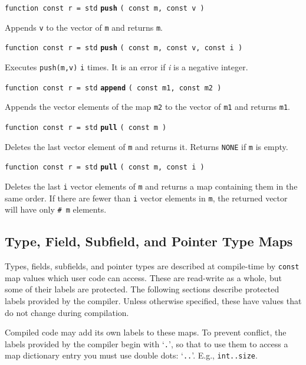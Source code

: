 \documentclass[12pt]{article}
\newcommand{\ttkey}[1]{{\tt \bfseries #1}}
\newenvironment{indpar}[1][0.3in]%
	{\begin{list}{}%
		     {\setlength{\itemsep}{0in}%
		      \setlength{\topsep}{0in}%
		      \setlength{\parsep}{1ex}%
		      \setlength{\labelwidth}{#1}%
		      \setlength{\leftmargin}{#1}%
		      \addtolength{\leftmargin}{\labelsep}}%
	 \item}%
	{\end{list}}
\begin{document}
{\tt function const r = std} \ttkey{push} {\tt ( const m, const v )}
\begin{indpar}
Appends {\tt v} to the vector of {\tt m} and returns {\tt m}.
\end{indpar}

{\tt function const r = std} \ttkey{push} {\tt ( const m, const v, const i )}
\begin{indpar}
Executes {\tt push(m,v)} {\tt i} times.  It is an error if {\em i}
is a negative integer.
\end{indpar}

{\tt function const r = std} \ttkey{append} {\tt ( const m1, const m2 )}
\begin{indpar}
Appends the vector elements of the map {\tt m2} to the vector of {\tt m1}
and returns {\tt m1}.
\end{indpar}

{\tt function const r = std} \ttkey{pull} {\tt ( const m )}
\begin{indpar}
Deletes the last vector element of {\tt m} and returns it.
Returns {\tt NONE} if {\tt m} is empty.
\end{indpar}

{\tt function const r = std} \ttkey{pull} {\tt ( const m, const i )}
\begin{indpar}
Deletes the last {\tt i} vector elements of {\tt m} and returns a map
containing them in the same order.
If there are fewer than {\tt i} vector elements
in {\tt m}, the returned vector will have only {\tt \# m} elements.
\end{indpar}

\subsection{Type, Field, Subfield, and Pointer Type Maps}
\label{TYPE-FIELD-SUBFIELD-MAPS}

Types, fields, subfields, and pointer types are described
at compile-time by {\tt const} map values which
user code can access.
These are read-write as a whole, but some of their
labels are protected.  The following sections describe protected labels
provided by the compiler.  Unless otherwise specified,
these have values that do not change during compilation.

Compiled code may add its own labels to these maps.
To prevent conflict, the labels provided by the compiler
begin with `{\tt .}', so
that to use them to access a map dictionary entry
you must use double dots: `{\tt ..}'.
E.g., {\tt int..size}.
\end{document}
